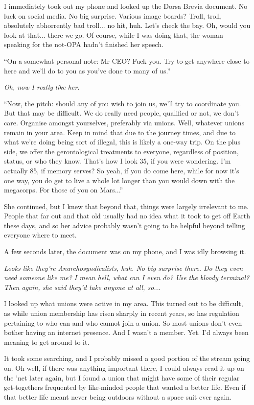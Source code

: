 \documentclass[a5paper]{report}%
\begin{document}
I immediately took out my phone and looked up the Dorsa Brevia document. No luck
on social media. No big surprise. Various image boards?
Troll, troll, absolutely abhorrently bad troll... no hit, huh. Let's check the
bay. Oh, would you look at that... there we go. Of course, while I was doing
that, the woman speaking for the not-OPA hadn't finished her speech.

``On a somewhat personal note: Mr CEO? Fuck you. Try to get anywhere close to
here and we'll do to you as you've done to many of us.''

\textit{Oh, now I \textnormal{really} like her.}

``Now, the pitch: should any of you wish to join us, we'll try to coordinate
you. But that may be difficult. We do really need people, qualified or not, we
don't care. Organise amongst yourselves, preferably via unions. Well, whatever
unions remain in your area. Keep in mind that due to the journey times, and due
to what we're doing being sort of illegal, this is likely a one-way trip. On the
plus side, we offer the gerontological treatments to everyone, regardless of
position, status, or who they know. That's how I look 35, if you were wondering.
I'm actually 85, if memory serves? So yeah, if you do come here, while for now
it's one way, you do get to live a whole lot longer than you would down with the
megacorps. For those of you on Mars...''

She continued, but I knew that beyond that, things were largely irrelevant to
me. People that far out and that old usually had no idea what it took to get off
Earth these days, and so her advice probably wasn't going to be helpful beyond
telling everyone where to meet.

A few seconds later, the document was on my phone, and I was idly browsing it.

\textit{Looks like they're Anarchosyndicalists, huh. No big surprise there. Do
  they even need someone like me? I mean hell, what can I even do? Use the
  bloody terminal? Then again, she said they'd take anyone at all, so...}

I looked up what unions were active in my area. This turned out to be difficult,
as while union membership has risen sharply in recent years, so has regulation
pertaining to who can and who cannot join a union. So most unions don't even
bother having an internet presence. And I wasn't a member. Yet. I'd always been
meaning to get around to it.

It took some searching, and I probably missed a good portion of the stream going
on. Oh well, if there was anything important there, I could always read it up on
the 'net later again, but I found a union that might have some of their regular
get-togethers frequented by like-minded people that wanted a better life. Even
if that better life meant never being outdoors without a space suit ever again.
\end{document}
